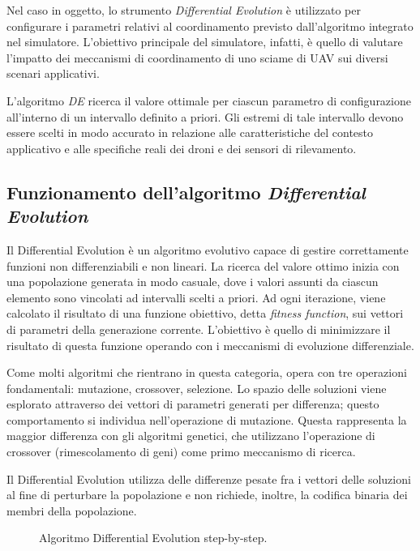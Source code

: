 Nel caso in oggetto, lo strumento \textit{Differential Evolution} è utilizzato per configurare i parametri relativi al coordinamento previsto dall’algoritmo integrato nel simulatore. 
L’obiettivo principale del simulatore, infatti, è quello di valutare l’impatto dei meccanismi di coordinamento di uno sciame di UAV sui diversi scenari applicativi. 

L’algoritmo \textit{DE} ricerca il valore ottimale per ciascun parametro di configurazione all’interno di un intervallo definito a priori. 
Gli estremi di tale intervallo devono essere scelti in modo accurato in relazione alle caratteristiche del contesto applicativo e alle specifiche reali dei droni e dei sensori di rilevamento.

\subsection{Funzionamento dell'algoritmo \textit{Differential Evolution}}

Il Differential Evolution è un algoritmo evolutivo capace di gestire correttamente funzioni non differenziabili e non lineari. 
La ricerca del valore ottimo inizia con una popolazione generata in modo casuale, dove i valori assunti da ciascun elemento sono vincolati ad intervalli scelti a priori. 
Ad ogni iterazione, viene calcolato il risultato di una funzione obiettivo, detta \textit{fitness function}, sui vettori di parametri della generazione corrente.
L'obiettivo è quello di minimizzare il risultato di questa funzione operando con i meccanismi di evoluzione differenziale.

Come molti algoritmi che rientrano in questa categoria, opera con tre operazioni fondamentali: mutazione, crossover, selezione. 
Lo spazio delle soluzioni viene esplorato attraverso dei vettori di parametri generati per differenza; questo comportamento si individua nell’operazione di mutazione. Questa rappresenta la maggior differenza con gli algoritmi genetici, che utilizzano l’operazione di crossover (rimescolamento di geni) come primo meccanismo di ricerca. 

Il Differential Evolution utilizza delle differenze pesate fra i vettori delle soluzioni al fine di perturbare la popolazione e non richiede, inoltre, la codifica binaria dei membri della popolazione.

\begin{figure}[H] 
    \captionsetup{justification=centering, margin=2cm, font=footnotesize}
    \begin{center}
    \end{center}
    \caption{Algoritmo Differential Evolution step-by-step.}
    \label{de_steps}
\end{figure}

